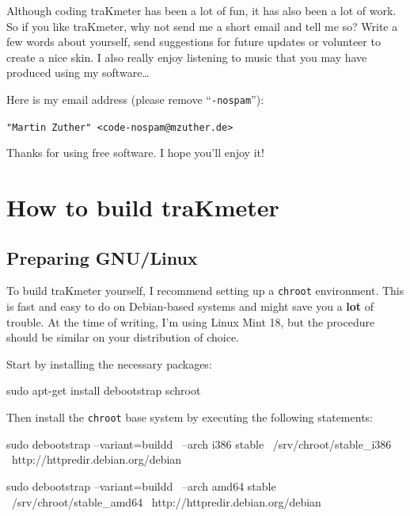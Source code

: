 Although coding traKmeter has been a lot of fun, it has also been a
lot of work.  So if you like traKmeter, why not send me a short email
and tell me so?  Write a few words about yourself, send suggestions
for future updates or volunteer to create a nice skin.  I also really
enjoy listening to music that you may have produced using my
software\dots

Here is my email address (please remove ``\texttt{-nospam}''):

\begin{center}
  \texttt{"Martin Zuther" <code-nospam@mzuther.de>}
\end{center}

Thanks for using free software.  I hope you'll enjoy it!

\appendix

\chapter{How to build traKmeter}
\label{chap:build_trakmeter}

\section{Preparing GNU/Linux}

To build traKmeter yourself, I recommend setting up a \texttt{chroot}
environment.  This is fast and easy to do on Debian-based systems and
might save you a \textbf{lot} of trouble.  At the time of writing, I'm
using Linux Mint 18, but the procedure should be similar on your
distribution of choice.

Start by installing the necessary packages:

\begin{VerbatimBoth}
  sudo apt-get install debootstrap schroot
\end{VerbatimBoth}

Then install the \texttt{chroot} base system by executing the
following statements:

\begin{Verbatim32}
  sudo debootstrap --variant=buildd \
    --arch i386 stable \
    /srv/chroot/stable_i386 \
    http://httpredir.debian.org/debian
\end{Verbatim32}

\begin{Verbatim64}
  sudo debootstrap --variant=buildd \
    --arch amd64 stable \
    /srv/chroot/stable_amd64 \
    http://httpredir.debian.org/debian
\end{Verbatim64}


